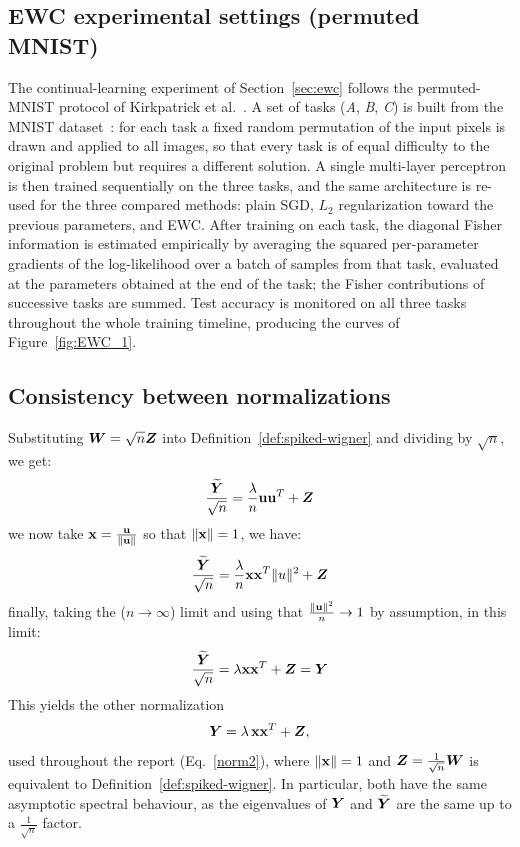 \documentclass[11pt]{article}
\begin{document}
\begin{rem}
\subsection{EWC experimental settings (permuted MNIST)}\label{adix:EWC_1}
The continual-learning experiment of Section~\ref{sec:ewc} follows the permuted-MNIST protocol of Kirkpatrick et al.~\cite{Kirkpatrick_2017}. A set of tasks (\emph{A}, \emph{B}, \emph{C}) is built from the MNIST dataset~\cite{LeCun1998}: for each task a fixed random permutation of the input pixels is drawn and applied to all images, so that every task is of equal difficulty to the original problem but requires a different solution. A single multi-layer perceptron is then trained sequentially on the three tasks, and the same architecture is re-used for the three compared methods: plain SGD, $L_2$ regularization toward the previous parameters, and EWC. After training on each task, the diagonal Fisher information is estimated empirically by averaging the squared per-parameter gradients of the log-likelihood over a batch of samples from that task, evaluated at the parameters obtained at the end of the task; the Fisher contributions of successive tasks are summed. Test accuracy is monitored on all three tasks throughout the whole training timeline, producing the curves of Figure~\ref{fig:EWC_1}.

\subsection{Consistency between normalizations}\label{adix:norm}
Substituting $  \bm{W} = \sqrt{n}\bm{Z}$ into Definition~\ref{def:spiked-wigner} and dividing by $\sqrt{n}$, we get:
    \[
    \frac{\widetilde{\bm{Y}}}{\sqrt{n}} = \frac{\lambda}{n}\boldsymbol{\mathbf{u}} \boldsymbol{\mathbf{u}} ^T + \bm{Z}
    \]
    we now take $\boldsymbol{\mathbf{x}} = \frac{\boldsymbol{\mathbf{u}}}{ \|\boldsymbol{\mathbf{u}} \|}$ so that $ \|\boldsymbol{\mathbf{x}} \| = 1$, we have:
    \[
    \frac{\widetilde{\bm{Y}}}{\sqrt{n}} = \frac{\lambda}{n}\boldsymbol{\mathbf{x}} \boldsymbol{\mathbf{x}} ^T  \|u \|^2 + \bm{Z}
    \]
    finally, taking the ($n \rightarrow \infty$) limit and using that $\frac{ \|\boldsymbol{\mathbf{u}}  \|^2}{n}\rightarrow1$ by assumption, in this limit:
    \[
    \frac{\widetilde{\bm{Y}}}{\sqrt{n}} = \lambda\boldsymbol{\mathbf{x}} \boldsymbol{\mathbf{x}} ^T + \bm{Z} = \bm{Y}
    \]
\noindent
This yields the other normalization
\[
    \bm{Y} = \lambda \,\boldsymbol{\mathbf{x}} \boldsymbol{\mathbf{x}}^T + \bm{Z},
\]
used throughout the report (Eq.~\eqref{norm2}), where $\|\boldsymbol{\mathbf{x}}\|=1$ and $\bm{Z} = \frac{1}{\sqrt n}\bm{W}$ is equivalent to Definition~\ref{def:spiked-wigner}. In particular, both have the same asymptotic spectral behaviour, as the eigenvalues of $\bm{Y}$ and $\widetilde{\bm{Y}}$ are the same up to a $\frac{1}{\sqrt{n}}$ factor.


\end{rem}
\end{document}
